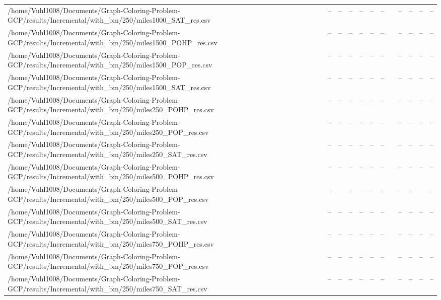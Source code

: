\begin{table}[htbp]
\begin{tabular}{llllllllllll}
/home/Vuhl1008/Documents/Graph-Coloring-Problem-GCP/results/Incremental/with\_bm/250/miles1000\_SAT\_res.csv & -- & -- & -- & -- & -- & -- & {} & -- & -- & -- & -- \\
/home/Vuhl1008/Documents/Graph-Coloring-Problem-GCP/results/Incremental/with\_bm/250/miles1500\_POHP\_res.csv & -- & -- & -- & -- & -- & -- & {} & -- & -- & -- & -- \\
/home/Vuhl1008/Documents/Graph-Coloring-Problem-GCP/results/Incremental/with\_bm/250/miles1500\_POP\_res.csv & -- & -- & -- & -- & -- & -- & {} & -- & -- & -- & -- \\
/home/Vuhl1008/Documents/Graph-Coloring-Problem-GCP/results/Incremental/with\_bm/250/miles1500\_SAT\_res.csv & -- & -- & -- & -- & -- & -- & {} & -- & -- & -- & -- \\
/home/Vuhl1008/Documents/Graph-Coloring-Problem-GCP/results/Incremental/with\_bm/250/miles250\_POHP\_res.csv & -- & -- & -- & -- & -- & -- & {} & -- & -- & -- & -- \\
/home/Vuhl1008/Documents/Graph-Coloring-Problem-GCP/results/Incremental/with\_bm/250/miles250\_POP\_res.csv & -- & -- & -- & -- & -- & -- & {} & -- & -- & -- & -- \\
/home/Vuhl1008/Documents/Graph-Coloring-Problem-GCP/results/Incremental/with\_bm/250/miles250\_SAT\_res.csv & -- & -- & -- & -- & -- & -- & {} & -- & -- & -- & -- \\
/home/Vuhl1008/Documents/Graph-Coloring-Problem-GCP/results/Incremental/with\_bm/250/miles500\_POHP\_res.csv & -- & -- & -- & -- & -- & -- & {} & -- & -- & -- & -- \\
/home/Vuhl1008/Documents/Graph-Coloring-Problem-GCP/results/Incremental/with\_bm/250/miles500\_POP\_res.csv & -- & -- & -- & -- & -- & -- & {} & -- & -- & -- & -- \\
/home/Vuhl1008/Documents/Graph-Coloring-Problem-GCP/results/Incremental/with\_bm/250/miles500\_SAT\_res.csv & -- & -- & -- & -- & -- & -- & {} & -- & -- & -- & -- \\
/home/Vuhl1008/Documents/Graph-Coloring-Problem-GCP/results/Incremental/with\_bm/250/miles750\_POHP\_res.csv & -- & -- & -- & -- & -- & -- & {} & -- & -- & -- & -- \\
/home/Vuhl1008/Documents/Graph-Coloring-Problem-GCP/results/Incremental/with\_bm/250/miles750\_POP\_res.csv & -- & -- & -- & -- & -- & -- & {} & -- & -- & -- & -- \\
/home/Vuhl1008/Documents/Graph-Coloring-Problem-GCP/results/Incremental/with\_bm/250/miles750\_SAT\_res.csv & -- & -- & -- & -- & -- & -- & {} & -- & -- & -- & -- \\

\end{tabular}
\end{table}
